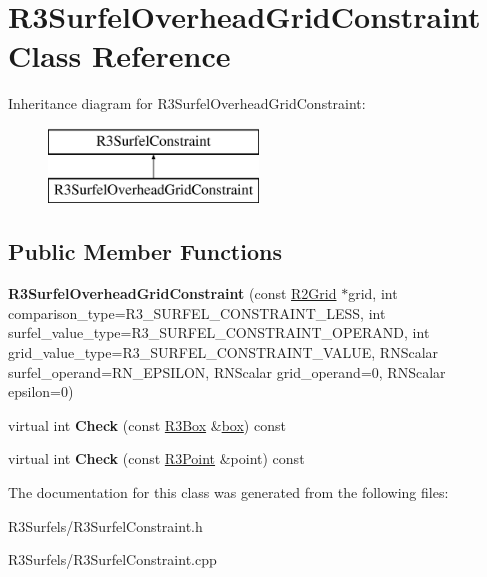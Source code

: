 \hypertarget{class_r3_surfel_overhead_grid_constraint}{}\section{R3\+Surfel\+Overhead\+Grid\+Constraint Class Reference}
\label{class_r3_surfel_overhead_grid_constraint}
Inheritance diagram for R3\+Surfel\+Overhead\+Grid\+Constraint\+:\begin{figure}[H]
\begin{center}
\leavevmode
\includegraphics[height=2.000000cm]{class_r3_surfel_overhead_grid_constraint}
\end{center}
\end{figure}
\subsection*{Public Member Functions}
\begin{DoxyCompactItemize}
\item 
{\bfseries R3\+Surfel\+Overhead\+Grid\+Constraint} (const \hyperlink{class_r2_grid}{R2\+Grid} $\ast$grid, int comparison\+\_\+type=R3\+\_\+\+S\+U\+R\+F\+E\+L\+\_\+\+C\+O\+N\+S\+T\+R\+A\+I\+N\+T\+\_\+\+L\+E\+SS, int surfel\+\_\+value\+\_\+type=R3\+\_\+\+S\+U\+R\+F\+E\+L\+\_\+\+C\+O\+N\+S\+T\+R\+A\+I\+N\+T\+\_\+\+O\+P\+E\+R\+A\+ND, int grid\+\_\+value\+\_\+type=R3\+\_\+\+S\+U\+R\+F\+E\+L\+\_\+\+C\+O\+N\+S\+T\+R\+A\+I\+N\+T\+\_\+\+V\+A\+L\+UE, R\+N\+Scalar surfel\+\_\+operand=R\+N\+\_\+\+E\+P\+S\+I\+L\+ON, R\+N\+Scalar grid\+\_\+operand=0, R\+N\+Scalar epsilon=0)\hypertarget{class_r3_surfel_overhead_grid_constraint_a121e859b41e14da2819c88a1f1c773a7}{}\label{class_r3_surfel_overhead_grid_constraint_a121e859b41e14da2819c88a1f1c773a7}

\item 
virtual int {\bfseries Check} (const \hyperlink{class_r3_box}{R3\+Box} \&\hyperlink{structbox}{box}) const \hypertarget{class_r3_surfel_overhead_grid_constraint_a752c8701de975daf845fbcd8d5e98b39}{}\label{class_r3_surfel_overhead_grid_constraint_a752c8701de975daf845fbcd8d5e98b39}

\item 
virtual int {\bfseries Check} (const \hyperlink{class_r3_point}{R3\+Point} \&point) const \hypertarget{class_r3_surfel_overhead_grid_constraint_a1992a407159b8aacb0363b8f01f5dd19}{}\label{class_r3_surfel_overhead_grid_constraint_a1992a407159b8aacb0363b8f01f5dd19}

\end{DoxyCompactItemize}


The documentation for this class was generated from the following files\+:\begin{DoxyCompactItemize}
\item 
R3\+Surfels/R3\+Surfel\+Constraint.\+h\item 
R3\+Surfels/R3\+Surfel\+Constraint.\+cpp\end{DoxyCompactItemize}
